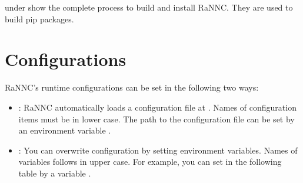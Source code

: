 \documentclass[letterpaper,10pt,english]{sphinxmanual}
\begin{document}
 under  show the complete process to build and install RaNNC.
They are used to build pip packages.


\chapter{Configurations}
\label{\detokenize{config:configurations}}\label{\detokenize{config::doc}}
RaNNC’s runtime configurations can be set in the following two ways:
\begin{itemize}
\item {} 
: RaNNC automatically loads a configuration file at . Names of configuration items must be in lower case. The path to the configuration file can be set by an environment variable .

\item {} 
: You can overwrite configuration by setting environment variables. Names of variables follows  in upper case. For example, you can set  in the following table by a variable .

\end{itemize}
\end{document}
